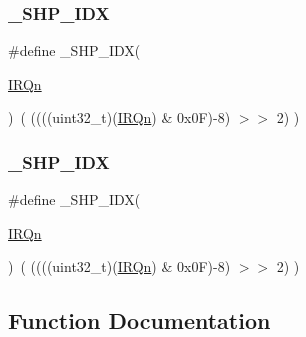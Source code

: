 \mbox{\label{group___c_m_s_i_s___core___n_v_i_c_functions_gaee4f7eb5d7e770ad51489dbceabb1755}} 
\subsubsection{\texorpdfstring{\_SHP\_IDX}{\_SHP\_IDX}\hspace{0.1cm}{\footnotesize\ttfamily [2/3]}}
{\footnotesize\ttfamily \#define \+\_\+\+S\+H\+P\+\_\+\+I\+DX(\begin{DoxyParamCaption}\item[{}]{\mbox{\hyperlink{group___configuration__section__for___c_m_s_i_s_ga666eb0caeb12ec0e281415592ae89083}{I\+R\+Qn}} }\end{DoxyParamCaption})~( ((((uint32\+\_\+t)(\mbox{\hyperlink{group___configuration__section__for___c_m_s_i_s_ga666eb0caeb12ec0e281415592ae89083}{I\+R\+Qn}}) \& 0x0\+F)-\/8) $>$$>$    2)     )}

\mbox{\label{group___c_m_s_i_s___core___n_v_i_c_functions_gaee4f7eb5d7e770ad51489dbceabb1755}} 
\subsubsection{\texorpdfstring{\_SHP\_IDX}{\_SHP\_IDX}\hspace{0.1cm}{\footnotesize\ttfamily [3/3]}}
{\footnotesize\ttfamily \#define \+\_\+\+S\+H\+P\+\_\+\+I\+DX(\begin{DoxyParamCaption}\item[{}]{\mbox{\hyperlink{group___configuration__section__for___c_m_s_i_s_ga666eb0caeb12ec0e281415592ae89083}{I\+R\+Qn}} }\end{DoxyParamCaption})~( ((((uint32\+\_\+t)(\mbox{\hyperlink{group___configuration__section__for___c_m_s_i_s_ga666eb0caeb12ec0e281415592ae89083}{I\+R\+Qn}}) \& 0x0\+F)-\/8) $>$$>$    2)     )}



\subsection{Function Documentation}
\mbox{\label{group___c_m_s_i_s___core___n_v_i_c_functions_ga332e10ef9605dc6eb10b9e14511930f8}} 

